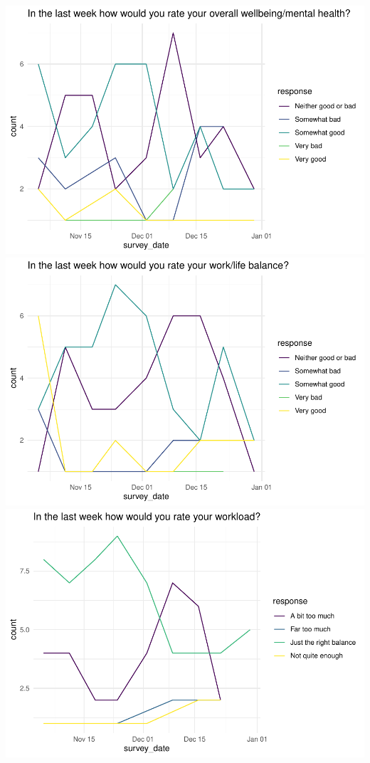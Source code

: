 \documentclass[
  10pt,
]{article}
\begin{document}
\includegraphics{../pdf/Report_files/figure-latex/plot_functions-1.pdf}
\includegraphics{../pdf/Report_files/figure-latex/plot_functions-2.pdf}
\includegraphics{../pdf/Report_files/figure-latex/plot_functions-3.pdf}
\end{document}
